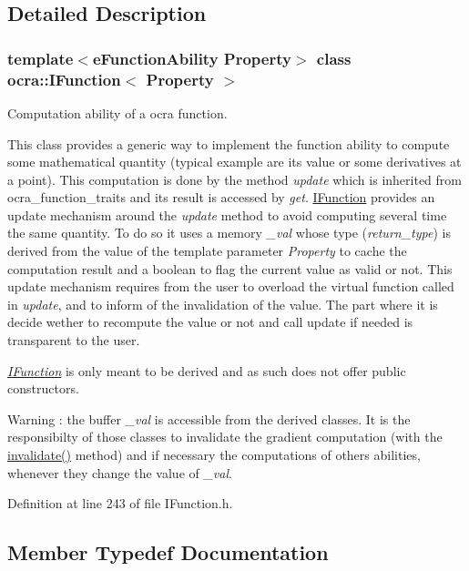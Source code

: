 \subsection{Detailed Description}
\subsubsection*{template$<$e\+Function\+Ability Property$>$\newline
class ocra\+::\+I\+Function$<$ Property $>$}

Computation ability of a ocra function. 

This class provides a generic way to implement the function ability to compute some mathematical quantity (typical example are its value or some derivatives at a point). This computation is done by the method {\itshape update} which is inherited from ocra\+\_\+function\+\_\+traits and its result is accessed by {\itshape get}. \hyperlink{classocra_1_1IFunction}{I\+Function} provides an update mechanism around the {\itshape update} method to avoid computing several time the same quantity. To do so it uses a memory {\itshape \+\_\+val} whose type ({\itshape return\+\_\+type}) is derived from the value of the template parameter {\itshape Property} to cache the computation result and a boolean to flag the current value as valid or not. This update mechanism requires from the user to overload the virtual function called in {\itshape update}, and to inform of the invalidation of the value. The part where it is decide wether to recompute the value or not and call update if needed is transparent to the user.

{\itshape \hyperlink{classocra_1_1IFunction}{I\+Function}} is only meant to be derived and as such does not offer public constructors.

\begin{DoxyWarning}{Warning}
\+: the buffer {\itshape \+\_\+val} is accessible from the derived classes. It is the responsibilty of those classes to invalidate the gradient computation (with the {\ttfamily \hyperlink{classocra_1_1IFunction_ae7cc0015416e006ad5682e7980f9c3d8}{invalidate()}} method) and if necessary the computations of others abilities, whenever they change the value of {\itshape \+\_\+val}. 
\end{DoxyWarning}


Definition at line 243 of file I\+Function.\+h.



\subsection{Member Typedef Documentation}
\hypertarget{classocra_1_1IFunction_ac6604adbd04613e1f545fb522cedbe3d}{}\label{classocra_1_1IFunction_ac6604adbd04613e1f545fb522cedbe3d} 
